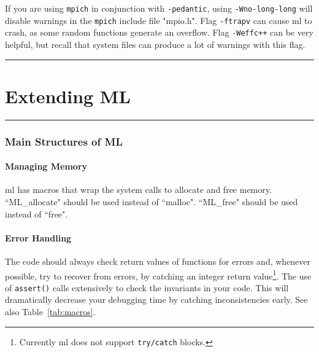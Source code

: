 \documentclass[10pt,letter,relax]{SANDreport}
\newcommand{\HRule}{\noindent\rule{\linewidth}{1mm}}
\newcommand{\ML}     {{\sc ml }}
\begin{document}
If you are using \verb!mpich! in conjunction with \verb!-pedantic!, using
\verb!-Wno-long-long! will disable warnings in the \verb!mpich! include file
"mpio.h".
Flag \verb!-ftrapv! can cause
\ML to crash, as some random functions generate an overflow. Flag
\verb!-Weffc++! can be very helpful, but recall that system files can
produce a lot of warnings with this flag.


\clearpage
\newpage

\vspace*{3cm}
\HRule
\part{Extending ML}

\HRule
\clearpage
\newpage


\section{Main Structures of ML}
\label{sec:structures}

\subsection{Managing Memory}

\ML has macros that wrap the system calls to allocate and free memory.
``ML\_allocate" should be used instead of ``malloc".
``ML\_free" should be used instead of ``free".

\subsection{Error Handling}

The code should always check return values of functions for errors and,
whenever possible, try to recover from errors, by catching an integer
return value\footnote{Currently \ML does not support {\tt try/catch}
  blocks.}.
The use of \verb!assert()! calls extensively to check the invariants in your
  code. This will dramatically decrease your debugging time by catching
  inconsistencies early. See also Table~\ref{tab:macros}.
\end{document}
